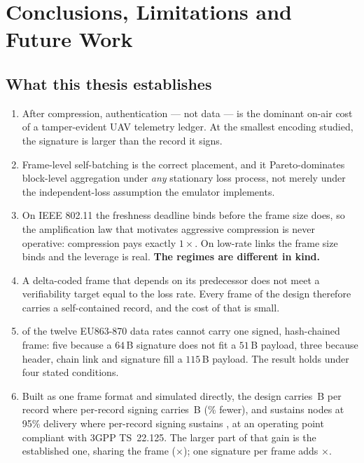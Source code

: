 \chapter{Conclusions, Limitations and Future Work}\label{ch:conclusions}

\section{What this thesis establishes}

\begin{enumerate}
\item After compression, authentication --- not data --- is the dominant on-air cost of a
tamper-evident UAV telemetry ledger. At the smallest encoding studied, the signature is larger than
the record it signs.

\item Frame-level self-batching is the correct placement, and it Pareto-dominates block-level
aggregation under \emph{any} stationary loss process, not merely under the independent-loss
assumption the emulator implements.

\item On IEEE 802.11 the freshness deadline binds before the frame size does, so the amplification
law that motivates aggressive compression is never operative: compression pays exactly $1\times$.
On low-rate links the frame size binds and the leverage is real. \textbf{The regimes are different
in kind.}

\item A delta-coded frame that depends on its predecessor does not meet a verifiability target
equal to the loss rate. Every frame of the design therefore carries a self-contained record, and
the cost of that is small.

\item \exclCountCap{} of the twelve EU863-870 data rates cannot carry one signed, hash-chained
frame: five because a $64$\,B signature does not fit a $51$\,B payload, three because header,
chain link and signature fill a $115$\,B payload. The result holds under four stated conditions.

\item Built as one frame format and simulated directly, the design carries \bprLeanDesign\,B per
record where per-record signing carries \bprLeanBase\,B (\saveLean\% fewer), and sustains
\nmaxLeanDesign{} nodes at 95\% delivery where per-record signing sustains \nmaxLeanBase, at
an operating point compliant with 3GPP TS~22.125. The larger part of that gain is the
established one, sharing the frame (\stepShareLean$\times$); one signature per frame adds
\stepSignLean$\times$.


\end{enumerate}
